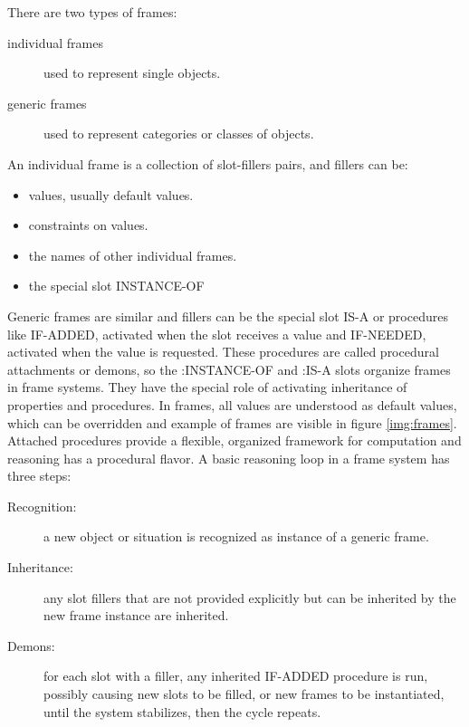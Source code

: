 There are two types of frames:
\begin{description}
   \item [individual frames] used to represent single objects.
   \item [generic frames] used to represent categories or classes of objects.
\end{description}
An individual frame is a collection of slot-fillers pairs, and fillers can be:
\begin{itemize}
   \item values, usually default values.
   \item constraints on values.
   \item the names of other individual frames.
   \item the special slot INSTANCE-OF
\end{itemize}
Generic frames are similar and fillers can be the special slot IS-A or procedures 
like IF-ADDED, activated when the slot receives a value and IF-NEEDED,
activated when the value is requested.\newline
These procedures are called procedural attachments or demons, so the :INSTANCE-OF 
and :IS-A slots organize frames in frame systems.\newline
They have the special role of activating inheritance of properties and procedures.\newline
In frames, all values are understood as default values, which can be overridden and
example of frames are visible in figure \ref{img:frames}.\newline
Attached procedures provide a flexible, organized framework for computation and 
reasoning has a procedural flavor.\newline
A basic reasoning loop in a frame system has three steps:
\begin{description}
   \item [Recognition: ] a new object or situation is recognized as instance
	                 of a generic frame.
   \item [Inheritance: ] any slot fillers that are not provided explicitly but can be 
	                 inherited by the new frame instance are inherited.
   \item [Demons: ] for each slot with a filler, any inherited IF-ADDED procedure is run,
       possibly causing new slots to be filled, or new frames to be instantiated,
       until the system stabilizes, then the cycle repeats.
\end{description}
